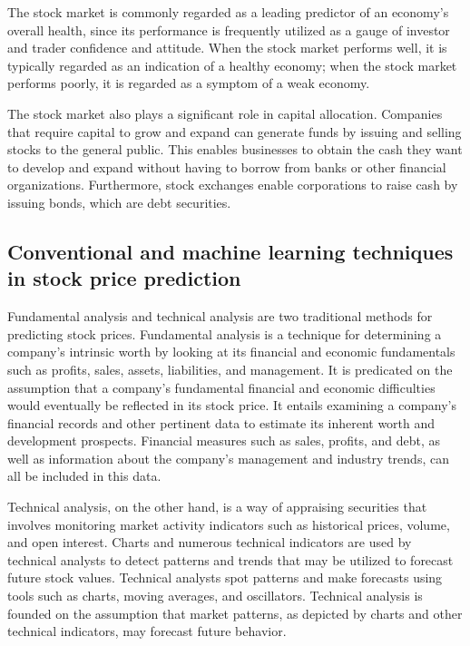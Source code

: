 \documentclass[a4paper]{article}
\begin{document}
The stock market is commonly regarded as a leading predictor of an economy's overall health, since its performance is frequently utilized as a gauge of investor and trader confidence and attitude. When the stock market performs well, it is typically regarded as an indication of a healthy economy; when the stock market performs poorly, it is regarded as a symptom of a weak economy.

The stock market also plays a significant role in capital allocation. Companies that require capital to grow and expand can generate funds by issuing and selling stocks to the general public. This enables businesses to obtain the cash they want to develop and expand without having to borrow from banks or other financial organizations. Furthermore, stock exchanges enable corporations to raise cash by issuing bonds, which are debt securities.
\subsection{Conventional and machine learning techniques in stock price prediction}
Fundamental analysis and technical analysis are two traditional methods for predicting stock prices. Fundamental analysis is a technique for determining a company's intrinsic worth by looking at its financial and economic fundamentals such as profits, sales, assets, liabilities, and management. It is predicated on the assumption that a company's fundamental financial and economic difficulties would eventually be reflected in its stock price. It entails examining a company's financial records and other pertinent data to estimate its inherent worth and development prospects. Financial measures such as sales, profits, and debt, as well as information about the company's management and industry trends, can all be included in this data.

Technical analysis, on the other hand, is a way of appraising securities that involves monitoring market activity indicators such as historical prices, volume, and open interest. Charts and numerous technical indicators are used by technical analysts to detect patterns and trends that may be utilized to forecast future stock values. Technical analysts spot patterns and make forecasts using tools such as charts, moving averages, and oscillators. Technical analysis is founded on the assumption that market patterns, as depicted by charts and other technical indicators, may forecast future behavior.
\end{document}
